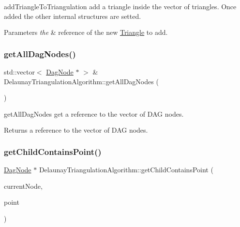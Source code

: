 add\+Triangle\+To\+Triangulation add a triangle inside the vector of triangles. Once added the other internal structures are setted. 


\begin{DoxyParams}{Parameters}
{\em the} & reference of the new \hyperlink{classTriangle}{Triangle} to add. \\
\hline
\end{DoxyParams}
\mbox{\label{classDelaunayTriangulationAlgorithm_a0e969b0ca72a0b59e7f2c70046a9b5f5}} 
\subsubsection{\texorpdfstring{get\+All\+Dag\+Nodes()}{getAllDagNodes()}}
{\footnotesize\ttfamily std\+::vector$<$ \hyperlink{classDagNode}{Dag\+Node} $\ast$ $>$ \& Delaunay\+Triangulation\+Algorithm\+::get\+All\+Dag\+Nodes (\begin{DoxyParamCaption}{ }\end{DoxyParamCaption})\hspace{0.3cm}{\ttfamily [inline]}}



get\+All\+Dag\+Nodes get a reference to the vector of D\+AG nodes. 

\begin{DoxyReturn}{Returns}
a reference to the vector of D\+AG nodes. 
\end{DoxyReturn}
\mbox{\label{classDelaunayTriangulationAlgorithm_a39f9f779ccecd10fc472707f420b25de}} 
\subsubsection{\texorpdfstring{get\+Child\+Contains\+Point()}{getChildContainsPoint()}}
{\footnotesize\ttfamily \hyperlink{classDagNode}{Dag\+Node} $\ast$ Delaunay\+Triangulation\+Algorithm\+::get\+Child\+Contains\+Point (\begin{DoxyParamCaption}\item[{\hyperlink{classDagNode}{Dag\+Node} $\ast$\&}]{current\+Node,  }\item[{const cg3\+::\+Point2\+Dd \&}]{point }\end{DoxyParamCaption})}



